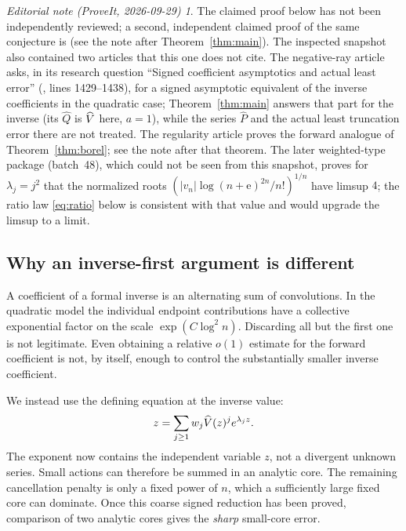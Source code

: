 \documentclass[11pt,a4paper]{article}
\numberwithin{equation}{section}
\theoremstyle{definition}
\theoremstyle{remark}
\newtheorem*{ednote}{Editorial note (ProveIt, 2026-09-29)}
\newcommand{\ee}{\mathrm e}\newcommand{\dd}{\mathrm d}
\newcommand{\abs}[1]{\lvert#1\rvert}
\begin{document}
\begin{ednote}
The claimed proof below has not been independently reviewed; a second,
independent claimed proof of the same conjecture is \cite{ed:sqf} (see the
note after Theorem~\ref{thm:main}). The inspected snapshot also contained
two articles that this one does not cite. The negative-ray article
\cite{ed:nrs} asks, in its research question ``Signed coefficient
asymptotics and actual least error''
(,
lines 1429--1438), for a signed asymptotic equivalent of the inverse
coefficients in the quadratic case; Theorem~\ref{thm:main} answers that
part for the inverse (its $\widehat Q$ is $\widehat V$ here, $a=1$), while the
series $\widehat P$ and the actual least truncation error there are not
treated. The regularity article \cite{ed:reg} proves the forward analogue
of Theorem~\ref{thm:borel}; see the note after that theorem. The later
weighted-type package \cite{ed:swt} (batch~48), which could not be seen
from this snapshot, proves for $\lambda_j=j^2$ that the normalized
roots $(\abs{v_n}\log(n+\ee)^{2n}/n!)^{1/n}$ have limsup $4$; the ratio
law \eqref{eq:ratio} below is consistent with that value and would upgrade
the limsup to a limit.
\end{ednote}

\subsection{Why an inverse-first argument is different}

A coefficient of a formal inverse is an alternating sum of convolutions.
In the quadratic model the individual endpoint contributions have a
collective exponential factor on the scale $\exp(C\log^2 n)$.
Discarding all but the first one is not legitimate. Even obtaining a
relative $o(1)$ estimate for the forward coefficient is not, by itself,
enough to control the substantially smaller inverse coefficient.

We instead use the defining equation at the inverse value:
\begin{equation}
 z=\sum_{j\ge1}w_j\widehat V(z)^j e^{\lambda_jz}.
 \label{eq:inverse-first-intro}
\end{equation}
The exponent now contains the independent variable $z$, not a divergent
unknown series. Small actions can therefore be summed in an analytic core.
The remaining cancellation penalty is only a fixed power of $n$, which a
sufficiently large fixed core can dominate. Once this coarse signed
reduction has been proved, comparison of two analytic cores gives the
\emph{sharp} small-core error.
\end{document}
